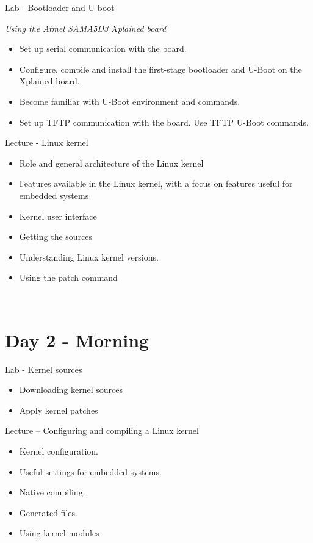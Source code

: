 \documentclass[a4paper,12pt,obeyspaces,spaces,hyphens]{article}
\begin{document}
\feagendatwocolumn
{Lab - Bootloader and U-boot}
{
  {\em Using the Atmel SAMA5D3 Xplained board}
  \begin{itemize}
  \item Set up serial communication with the board.
  \item Configure, compile and install the first-stage bootloader
        and U-Boot on the Xplained board.
  \item Become familiar with U-Boot environment and commands.
  \item Set up TFTP communication with the board. Use TFTP U-Boot commands.
  \end{itemize}
}
{Lecture - Linux kernel}
{
  \begin{itemize}
  \item Role and general architecture of the Linux kernel
  \item Features available in the Linux kernel,
        with a focus on features useful for embedded systems
  \item Kernel user interface
  \item Getting the sources
  \item Understanding Linux kernel versions.
  \item Using the patch command
  \end{itemize}
}
\\

\section{Day 2 - Morning}

\feagendatwocolumn
{Lab - Kernel sources}
{
  \begin{itemize}
  \item Downloading kernel sources
  \item Apply kernel patches
  \end{itemize}
}
{Lecture – Configuring and compiling a Linux kernel}
{
  \begin{itemize}
  \item Kernel configuration.
  \item Useful settings for embedded systems.
  \item Native compiling.
  \item Generated files.
  \item Using kernel modules
  \end{itemize}
}
\end{document}
